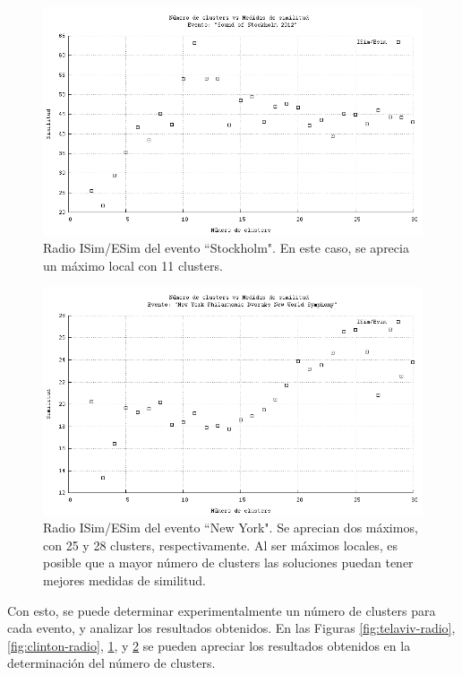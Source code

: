 \begin{figure}[h!]
  \centering
  \includegraphics[width=12cm]{./img/stockholm-clusters-radio.png}
  \caption[Radios de similitud para evento 3]
   { Radio ISim/ESim del evento ``Stockholm". En este caso, se aprecia un máximo local con 11 clusters.\label{fig:stockholm-radio}}
\end{figure}

\begin{figure}[h!]
  \centering
  \includegraphics[width=12cm]{./img/dvorak-clusters-radio.png}
  \caption[Radios de similitud para evento 4]
   { Radio ISim/ESim del evento ``New York". Se aprecian dos máximos, con 25 y 28 clusters, respectivamente. Al ser máximos locales, es posible que a mayor número de clusters las soluciones puedan tener mejores medidas de similitud. \label{fig:dvorak-radio} }
\end{figure}

Con esto, se puede determinar experimentalmente un número de clusters
para cada evento, y analizar los resultados obtenidos. En las Figuras \ref{fig:telaviv-radio}, \ref{fig:clinton-radio}, \ref{fig:stockholm-radio}, y \ref{fig:dvorak-radio} se pueden apreciar los resultados obtenidos en la determinación del número de clusters.

